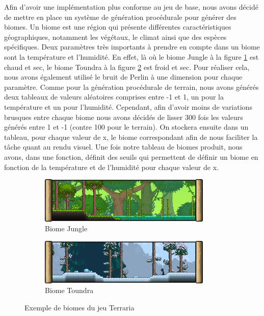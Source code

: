 \documentclass[12pt]{article}
\begin{document}
Afin d'avoir une implémentation plus conforme au jeu de base, nous avons décidé de mettre en place un système de génération procédurale pour générer des biomes.
Un biome est une région qui présente différentes caractéristiques géographiques, notamment les végétaux, le climat ainsi que des espèces spécifiques. Deux paramètres très importants à prendre en compte dans un biome sont la température et l'humidité. En effet, là où le biome Jungle à la figure \ref{jungle} est chaud et sec, le biome Toundra à la figure \ref{toundra} est froid et sec. Pour réaliser cela, nous avons également utilisé le bruit de Perlin à une dimension pour chaque paramètre. Comme pour la génération procédurale de terrain, nous avons générés deux tableaux de valeurs aléatoires comprises entre -1 et 1, un pour la température et un pour l'humidité. Cependant, afin d'avoir moins de variations brusques entre chaque biome nous avons décidés de lisser 300 fois les valeurs générés entre 1 et -1 (contre 100 pour le terrain). 
On stockera ensuite dans un tableau, pour chaque valeur de x, le biome correspondant afin de nous faciliter la tâche quant au rendu visuel. Une fois notre tableau de biomes produit, nous avons, dans une fonction, définit des seuils qui permettent de définir un biome en fonction de la température et de l'humidité pour chaque valeur de x.\par
\vspace{1cm}

\begin{figure}[!h]
  \centering
  \begin{subfigure}[b]{0.4\textwidth}
    \centering
    \includegraphics[width=0.9\textwidth]{assets/jungle.png}
    \caption{Biome Jungle}
    \label{jungle}
  \end{subfigure}
  \hspace{1cm}
  \begin{subfigure}[b]{0.4\textwidth}
    \centering
    \includegraphics[width=0.9\textwidth]{assets/toundra.png}
    \caption{Biome Toundra}
    \label{toundra}
  \end{subfigure}
  \caption{Exemple de biomes du jeu Terraria}
  \label{biomes}
\end{figure}
\newpage
\end{document}
